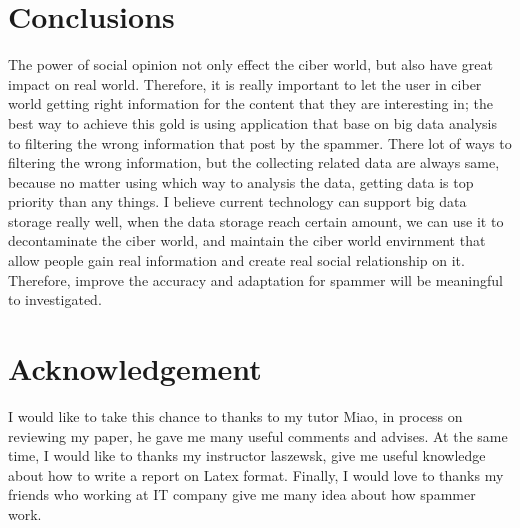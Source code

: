 \documentclass[sigconf]{acmart}
\begin{document}
\section{Conclusions}
The power of social opinion not only effect the ciber world, but also have great impact on real world. Therefore, it is really important to let the user in ciber world getting right information for the content that they are interesting in; the best way to achieve this gold is using application that base on big data analysis to filtering the wrong information that post by the spammer. There lot of ways to filtering the wrong information, but the collecting related data are always same, because no matter using which way to analysis the data, getting data is top priority than any things. I believe current technology can support big data storage really well, when the data storage reach certain amount, we can use it to decontaminate the ciber world, and maintain the ciber world envirnment that allow people gain real information and create real social relationship on it. Therefore, improve the accuracy and adaptation for spammer will be meaningful to investigated. 




\section{Acknowledgement}

I would like to  take this chance to thanks to my tutor Miao, in process on reviewing my paper, he gave me many useful comments and advises. At the same time, I would like to thanks my instructor laszewsk, give me useful knowledge about how to write a report on Latex format. Finally, I would love to thanks my friends who working at IT company  give me many idea about how spammer work.



 
\end{document}
